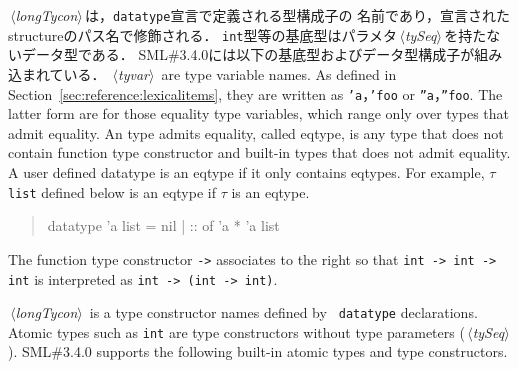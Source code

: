 \documentclass{jbook}
\newcommand{\smlsharp}{SML\#}
\newcommand{\version}{3.4.0}
\newcommand{\code}[1]{\mbox{\large\tt #1}}
\newcommand{\nonterm}[1]{\mbox{$\,\langle$}{\it #1}\mbox{$\rangle\,$}}
\newcommand{\term}[1]{\mbox{{\tt #1}}}
\newenvironment{program}{\begin{quote}\begin{tt}}%
                        {\end{tt}\end{quote}}
\begin{document}
	\nonterm{longTycon}は，{\tt datatype}宣言で定義される型構成子の
名前であり，宣言されたstructureのパス名で修飾される．
	\term{int}型等の基底型はパラメタ\nonterm{tySeq}を持たないデータ型である．
	\smlsharp{}\version{}には以下の基底型およびデータ型構成子が組み込まれている．
\else%
	\nonterm{tyvar} are type variable names.
	As defined in Section~\ref{sec:reference:lexicalitems}, they are written 
as {\tt 'a}，{\tt 'foo} or
{\tt ''a}，{\tt ''foo}.
	The latter form are for those equality type variables, which
range only over types that admit equality.
	An type admits equality, called eqtype, is any type that does
not contain function type constructor and built-in types that does not
admit equality.
	A user defined datatype is an eqtype if it only contains eqtypes.	
	For example, \code{$\tau$ list} defined below is an eqtype if
$\tau$ is an eqtype. 
\begin{program}
datatype 'a list = nil | :: of 'a * 'a list 
\end{program}

	The function type constructor \term{->} associates to the right
so that {\tt int -> int -> int} is interpreted as {\tt int -> (int -> int)}.

	\nonterm{longTycon} is a type constructor names defined by {\tt
datatype} declarations.
	Atomic types such as \term{int} are type constructors without
type parameters (\nonterm{tySeq}).
	\smlsharp{}\version{} supports the following built-in atomic
types and type constructors.
\fi%
\end{document}
